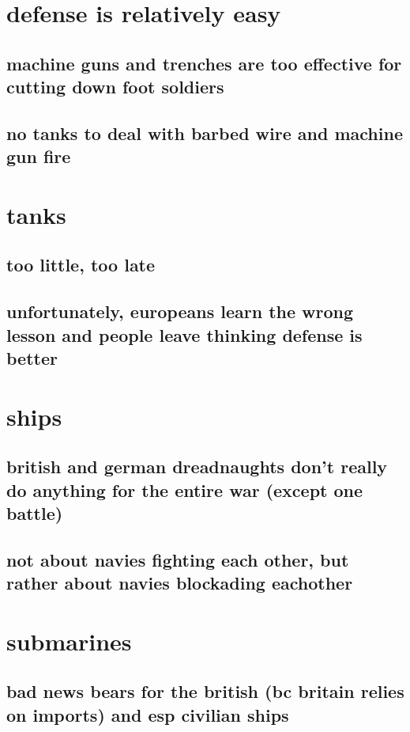 \documentclass[letterpaper]{article}
\begin{document}
\section{defense is relatively easy}
\label{sec:org57f35a4}
\subsection{machine guns and trenches are too effective for cutting down foot soldiers}
\label{sec:org8e74ef4}
\subsection{no tanks to deal with barbed wire and machine gun fire}
\label{sec:org2d4b3ab}
\section{tanks}
\label{sec:org24052bb}
\subsection{too little, too late}
\label{sec:org1f78dec}
\subsection{unfortunately, europeans learn the wrong lesson and people leave thinking defense is better}
\label{sec:org44ea6d0}
\section{ships}
\label{sec:org789c7ba}
\subsection{british and german dreadnaughts don't really do anything for the entire war (except one battle)}
\label{sec:orge0c4314}
\subsection{not about navies fighting each other, but rather about navies blockading eachother}
\label{sec:orgc7950e0}
\section{submarines}
\label{sec:org3569f0f}
\subsection{bad news bears for the british (bc britain relies on imports) and esp civilian ships}
\label{sec:orgd3b1a27}
\end{document}
